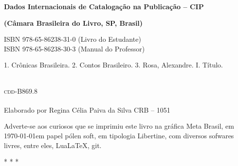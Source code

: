 \pagebreak


\noindent\textbf{Dados Internacionais de Catalogação na Publicação -- CIP}

\noindent\textbf{(Câmara Brasileira do Livro, SP, Brasil)}

\hrulefill

\hspace{20pt}ISBN 978-65-86238-31-0 (Livro do Estudante)\\
\hspace{20pt}ISBN 978-65-86238-30-3 (Manual do Professor)\\[6pt]

\hspace{20pt}\parbox{190pt}{1. Crônicas Brasileira. 2. Contos Brasileiro. 3. Rosa, Alexandre. I. Título.}\\[6pt]

\hspace{188pt}\textsc{cdd}-B869.8\\

\hrulefill\\
\noindent{}Elaborado por Regina Célia Paiva da Silva CRB -- 1051 

\mbox{}\vfill

\small\thispagestyle{empty}

\begin{center}

\begin{minipage}{.8\textwidth}\tiny\noindent{}

\centering

Adverte-se aos curiosos que se imprimiu este 
livro na gráfica Meta Brasil, 
em \today em papel pólen soft, em tipologia Libertine, 
com diversos sofwares livres, 
entre eles, Lua\LaTeX, git. 


* * * 

\end{minipage}

\end{center}